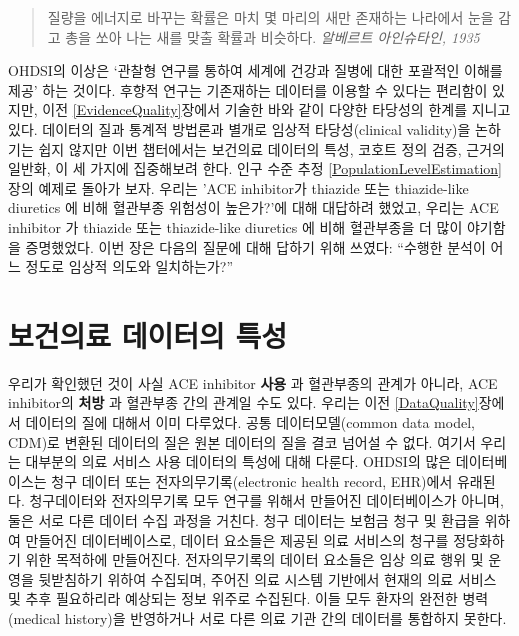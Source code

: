 \documentclass[11pt]{book}
\theoremstyle{definition}
\theoremstyle{definition}
\theoremstyle{definition}
\theoremstyle{remark}
\begin{document}
\begin{quote}
질량을 에너지로 바꾸는 확률은 마치 몇 마리의 새만 존재하는 나라에서 눈을
감고 총을 쏘아 나는 새를 맞출 확률과 비슷하다. \emph{알베르트
아인슈타인, 1935}
\end{quote}

OHDSI의 이상은 `관찰형 연구를 통하여 세계에 건강과 질병에 대한 포괄적인
이해를 제공' 하는 것이다. 후향적 연구는 기존재하는 데이터를 이용할 수
있다는 편리함이 있지만, 이전 \ref{EvidenceQuality}장에서 기술한 바와
같이 다양한 타당성의 한계를 지니고 있다. 데이터의 질과 통계적 방법론과
별개로 임상적 타당성(clinical validity)을 논하기는 쉽지 않지만 이번
챕터에서는 보건의료 데이터의 특성, 코호트 정의 검증, 근거의 일반화, 이
세 가지에 집중해보려 한다. 인구 수준 추정
\ref{PopulationLevelEstimation}장의 예제로 돌아가 보자. 우리는 'ACE
inhibitor가 thiazide 또는 thiazide-like diuretics 에 비해 혈관부종
위험성이 높은가?'에 대해 대답하려 했었고, 우리는 ACE inhibitor 가
thiazide 또는 thiazide-like diuretics 에 비해 혈관부종을 더 많이
야기함을 증명했었다. 이번 장은 다음의 질문에 대해 답하기 위해 쓰였다:
``수행한 분석이 어느 정도로 임상적 의도와 일치하는가?''

\section{보건의료 데이터의 특성}\label{CharacteristicsOfDatabase}

우리가 확인했던 것이 사실 ACE inhibitor \textbf{사용} 과 혈관부종의
관계가 아니라, ACE inhibitor의 \textbf{처방} 과 혈관부종 간의 관계일
수도 있다. 우리는 이전 \ref{DataQuality}장에서 데이터의 질에 대해서 이미
다루었다. 공통 데이터모델(common data model, CDM)로 변환된 데이터의 질은
원본 데이터의 질을 결코 넘어설 수 없다. 여기서 우리는 대부분의 의료
서비스 사용 데이터의 특성에 대해 다룬다. OHDSI의 많은 데이터베이스는
청구 데이터 또는 전자의무기록(electronic health record, EHR)에서
유래된다. 청구데이터와 전자의무기록 모두 연구를 위해서 만들어진
데이터베이스가 아니며, 둘은 서로 다른 데이터 수집 과정을 거친다. 청구
데이터는 보험금 청구 및 환급을 위하여 만들어진 데이터베이스로, 데이터
요소들은 제공된 의료 서비스의 청구를 정당화하기 위한 목적하에
만들어진다. 전자의무기록의 데이터 요소들은 임상 의료 행위 및 운영을
뒷받침하기 위하여 수집되며, 주어진 의료 시스템 기반에서 현재의 의료
서비스 및 추후 필요하리라 예상되는 정보 위주로 수집된다. 이들 모두
환자의 완전한 병력(medical history)을 반영하거나 서로 다른 의료 기관
간의 데이터를 통합하지 못한다.
\end{document}
